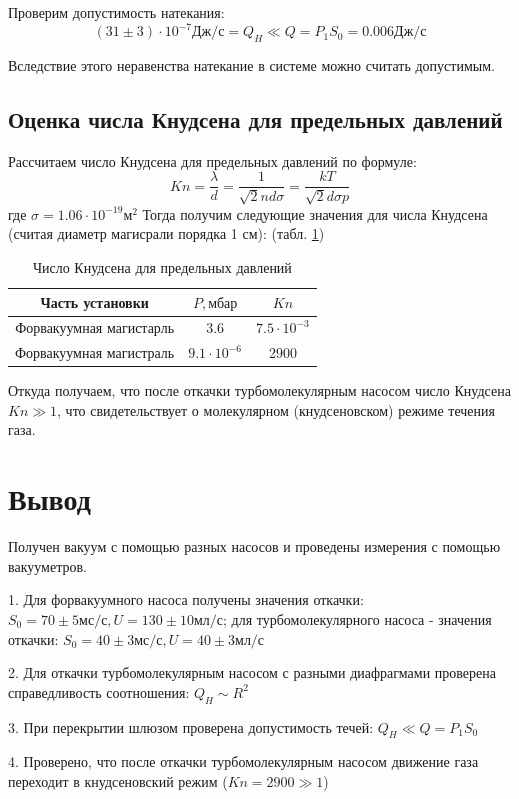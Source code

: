 \documentclass[a4paper,12pt]{article} %
\begin{document}
Проверим допустимость натекания:
\begin{equation}
(31 \pm 3) \cdot 10^{-7} \text{Дж/с} = Q_H \ll Q = P_1 S_0 = 0.006 \text{Дж/с}
\end{equation}

Вследствие этого неравенства натекание в системе можно считать допустимым.

\subsection{Оценка числа Кнудсена для предельных давлений}
Рассчитаем число Кнудсена для предельных давлений по формуле:
\begin{equation}
Kn=\frac{\lambda}{d}=\frac{1}{\sqrt{2}nd\sigma}=\frac{kT}{\sqrt{2}d\sigma p}
\end{equation}
где $\sigma = 1.06 \cdot 10^{-19} м^2$ 
Тогда получим следующие значения для числа Кнудсена (считая диаметр магисрали порядка 1 см): (табл. \ref{кнудсен})


\begin{table}
\caption{Число Кнудсена для предельных давлений}
\label{кнудсен}
\begin{tabular}{|c|c|c|}
\hline 
Часть установки & $P, мбар$ & $Kn$  \\ 
\hline 
Форвакуумная магистарль &  3.6 & $7.5\cdot 10^{-3}$ \\ 
\hline 
Форвакуумная магистраль & $9.1 \cdot 10^{-6}$  & 2900\\ 
\hline
\end{tabular} 
\end{table}

Откуда получаем, что после откачки турбомолекулярным насосом число Кнудсена $Kn\gg 1$, что свидетельствует о молекулярном (кнудсеновском) режиме течения газа.

\section{Вывод}
Получен вакуум с помощью разных насосов и проведены измерения с помощью вакууметров.

1. Для форвакуумного насоса получены значения откачки: $S_0 = 70 \pm 5  \text{мс/с}, U = 130 \pm 10 \text{мл/с} $; для турбомолекулярного насоса - значения откачки:  $S_0 = 40 \pm 3  \text{мс/с}, U = 40 \pm 3 \text{мл/с} $

2. Для откачки турбомолекулярным насосом с разными диафрагмами проверена справедливость соотношения: $Q_H \sim R^2$ 

3. При перекрытии шлюзом проверена допустимость течей: $Q_H \ll Q = P_1 S_0$

4. Проверено, что после откачки турбомолекулярным насосом движение газа переходит в кнудсеновский режим ($Kn=2900 \gg 1$)
\end{document}
